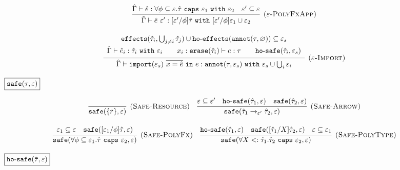 \documentclass{llncs}
\newcommand{\keywadj}[1]{\mathtt{#1}}
\newcommand{\keyw}[1]{\keywadj{#1}~}
\newcommand{\kw}[1]{\keyw{ #1 }}
\newcommand{\kwa}[1]{\keywadj{ #1 }}
\newcommand{\hyphen}{\hbox{-}}
\newcommand{\hofx}[1]{ \kwa{ho \hyphen effects}(#1) }
\newcommand{\safe}[2]{ \kwa{safe}(#1, #2) }
\newcommand{\hosafe}[2]{ \kwa{ho \hyphen safe}(#1, #2) }
\newcommand{\annot}[2]{
	\keywadj{annot}(#1, #2)
}
\newcommand{\polycap}[3]{
	\forall #1. #2~ \kw{caps} #3
}
\begin{document}
\[\begin{array}{c}
\infer[\textsc{($\varepsilon$-PolyFxApp)}]
	{ \hat \Gamma \vdash \hat e~\varepsilon' : [\varepsilon'/\phi]\hat \tau~\kw{with} [\varepsilon'/\phi]\varepsilon_1 \cup \varepsilon_2 }
	{ \hat \Gamma \vdash \hat e: \polycap{\phi \subseteq \varepsilon}{\hat \tau}{\varepsilon_1}~\kw{with} \varepsilon_2 & \varepsilon' \subseteq \varepsilon } \\[2ex]

\infer[\textsc{($\varepsilon$-Import)}]
	{ \hat \Gamma \vdash \kwa{import}(\varepsilon_s)~\overline{x = \hat e}~\kw{in} e: \kwa{annot}(\tau, \varepsilon_s)~\kw{with} \varepsilon_s \cup \bigcup_{i} \varepsilon_i }
{{\def\arraystretch{1.4}
  \begin{array}{c}
\kwa{effects}(\hat \tau_i, \bigcup_{j \neq i} \hat \tau_j) \cup \hofx{\annot{\tau}{\varnothing}}\subseteq \varepsilon_s \\
\hat \Gamma \vdash \hat e_i: \hat \tau_i~\kw{with} \varepsilon_i  ~~~~~~ x_i: \kwa{erase}(\hat \tau_i) \vdash e: \tau ~~~~~~ \hosafe{\hat \tau_i}{\varepsilon_s}
  \end{array}}} 
 
 
\end{array}
\]





\noindent
$\fbox{$\kwa{safe(\tau, \varepsilon)}$}$

\[
\begin{array}{c}

\infer[\textsc{(Safe-Resource)}]
	{\kwa{safe}(\{ \bar r \}, \varepsilon)}
	{}
~~~
\infer[\textsc{(Safe-Arrow)}]
	{\kwa{safe}(\hat \tau_1 \rightarrow_{\varepsilon'} \hat \tau_2, \varepsilon)}
	{\varepsilon \subseteq \varepsilon' & \kwa{ho \hyphen safe}(\hat \tau_1, \varepsilon) & \kwa{safe}(\hat \tau_2, \varepsilon)} \\[3ex]

\infer[\textsc{(Safe-PolyFx)}]
	{\safe{\polycap{\phi \subseteq \varepsilon_1}{\hat \tau}{\varepsilon_2}}{\varepsilon}}
	{\varepsilon_1 \subseteq \varepsilon & \safe{[\varepsilon_1/\phi]\hat \tau}{\varepsilon}} ~~~

\infer[\textsc{(Safe-PolyType)}]
	{\safe{\polycap{X <: \hat \tau_1}{\hat \tau_2}{\varepsilon_2}}{\varepsilon}}
	{\hosafe{\hat \tau_1}{\varepsilon} & \safe{[\hat \tau_1/X]\hat \tau_2}{\varepsilon} & \varepsilon \subseteq \varepsilon_1}

\end{array}
\]

\noindent
$\fbox{$\kwa{ho \hyphen safe(\hat \tau, \varepsilon)}$}$
\end{document}
